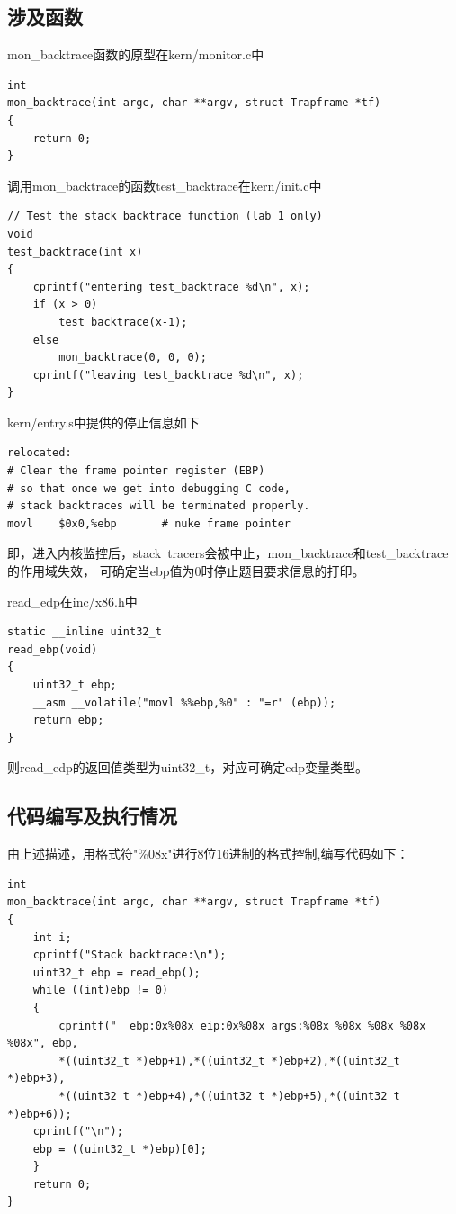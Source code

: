 \documentclass[12pt,a4paper,UTF8]{article}
\begin{document}
	\subsection{涉及函数}
	mon\_backtrace函数的原型在kern/monitor.c中
	\begin{lstlisting}[style=CPP]
int
mon_backtrace(int argc, char **argv, struct Trapframe *tf)
{
	return 0;
}
	\end{lstlisting}

	调用mon\_backtrace的函数test\_backtrace在kern/init.c中
	\begin{lstlisting}[style=CPP]
// Test the stack backtrace function (lab 1 only)
void
test_backtrace(int x)
{
	cprintf("entering test_backtrace %d\n", x);
	if (x > 0)
		test_backtrace(x-1);
	else
		mon_backtrace(0, 0, 0);
	cprintf("leaving test_backtrace %d\n", x);
}
	\end{lstlisting}

	kern/entry.s中提供的停止信息如下
	\begin{lstlisting}[style=CPP]
relocated:
# Clear the frame pointer register (EBP)
# so that once we get into debugging C code,
# stack backtraces will be terminated properly.
movl	$0x0,%ebp		# nuke frame pointer
	\end{lstlisting}

	即，进入内核监控后，stack\ tracers会被中止，mon\_backtrace和test\_backtrace的作用域失效，
	可确定当ebp值为0时停止题目要求信息的打印。

	read\_edp在inc/x86.h中
	\begin{lstlisting}[style=CPP]
static __inline uint32_t
read_ebp(void)
{
	uint32_t ebp;
	__asm __volatile("movl %%ebp,%0" : "=r" (ebp));
	return ebp;
}
	\end{lstlisting}

	则read\_edp的返回值类型为uint32\_t，对应可确定edp变量类型。

	\subsection{代码编写及执行情况}
	由上述描述，用格式符"\%08x"进行8位16进制的格式控制,编写代码如下：
	\begin{lstlisting}[style=CPP]
int
mon_backtrace(int argc, char **argv, struct Trapframe *tf)
{
	int i;
	cprintf("Stack backtrace:\n");
	uint32_t ebp = read_ebp();
	while ((int)ebp != 0)
	{
		cprintf("  ebp:0x%08x eip:0x%08x args:%08x %08x %08x %08x %08x", ebp,
		*((uint32_t *)ebp+1),*((uint32_t *)ebp+2),*((uint32_t *)ebp+3),
		*((uint32_t *)ebp+4),*((uint32_t *)ebp+5),*((uint32_t *)ebp+6));
	cprintf("\n");
	ebp = ((uint32_t *)ebp)[0];
	}
	return 0;
}
	\end{lstlisting}
\end{document}
